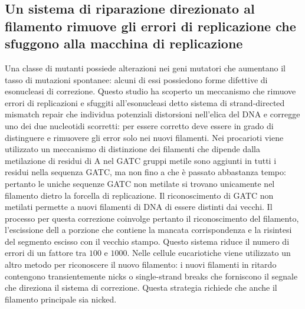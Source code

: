 \subsection{Un sistema di riparazione direzionato al filamento rimuove gli errori di replicazione che sfuggono alla macchina di replicazione}
Una classe di mutanti possiede alterazioni nei geni mutatori che aumentano il tasso di mutazioni spontanee: alcuni di essi possiedono forme difettive di esonucleasi di correzione. Questo
studio ha scoperto un meccanismo che rimuove errori di replicazioni e sfuggiti all'esonucleasi detto sistema di strand-directed mismatch repair che individua potenziali distorsioni 
nell'elica del DNA e corregge uno dei due nucleotidi scorretti: per essere corretto deve essere in grado di distinguere e rimuovere gli error solo nei nuovi filamenti. Nei procarioti
viene utilizzato un meccanismo di distinzione dei filamenti che dipende dalla metilazione di residui di A nel GATC gruppi metile sono aggiunti in tutti i residui nella sequenza GATC, ma 
non fino a che \`e passato abbastanza tempo: pertanto le uniche sequenze GATC non metilate si trovano unicamente nel filamento dietro la forcella di replicazione. Il riconoscimento di 
GATC non metilati permette a nuovi filamenti di DNA di essere distinti dai vecchi. Il processo per questa correzione coinvolge pertanto il riconoscimento del filamento, l'escissione dell
a porzione che contiene la mancata corrispondenza e la risintesi del segmento escisso con il vecchio stampo. Questo sistema riduce il numero di errori di un fattore tra $100$ e $1000$. 
Nelle cellule eucariotiche viene utilizzato un altro metodo per riconoscere il nuovo filamento: i nuovi filamenti in ritardo contengono transientemente nicks o single-strand breaks che
forniscono il segnale che direziona il sistema di correzione. Questa strategia richiede che anche il filamento principale sia nicked. 
